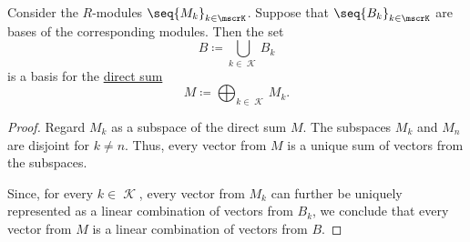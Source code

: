 \begin{proposition}\label{thm:basis_of_direct_sum}
  Consider the \( R \)-modules \( \seq{ M_k }_{k \in \mscrK} \). Suppose that \( \seq{ B_k }_{k \in \mscrK} \) are bases of the corresponding modules. Then the set
  \begin{equation*}
    B \coloneqq \bigcup_{k \in \mscrK} B_k
  \end{equation*}
  is a basis for the \hyperref[def:semimodule_direct_product]{direct sum}
  \begin{equation*}
    M \coloneqq \bigoplus_{k \in \mscrK} M_k.
  \end{equation*}
\end{proposition}
\begin{proof}
  Regard \( M_k \) as a subspace of the direct sum \( M \). The subspaces \( M_k \) and \( M_n \) are disjoint for \( k \neq n \). Thus, every vector from \( M \) is a unique sum of vectors from the subspaces.

  Since, for every \( k \in \mscrK \), every vector from \( M_k \) can further be uniquely represented as a linear combination of vectors from \( B_k \), we conclude that every vector from \( M \) is a linear combination of vectors from \( B \).
\end{proof}

